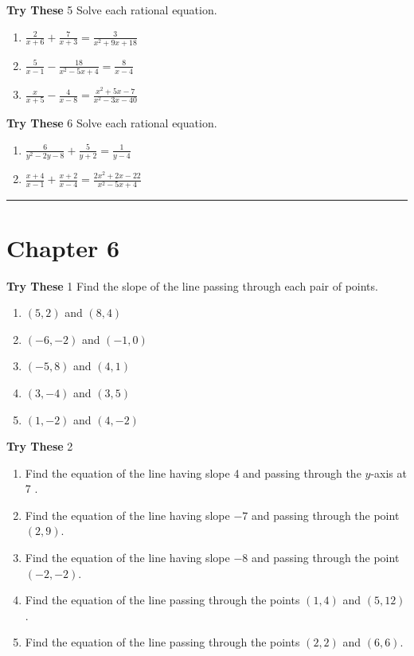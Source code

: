 \documentclass[a4paper]{JAC2003}
\begin{document}
\noindent\textcolor{red!75!black}{\textbf{Try These}} 5 Solve each rational equation.
\begin{enumerate}
\item $\frac{2}{x+6}+\frac{7}{x+3}=\frac{3}{x^{2}+9 x+18}$

\item $\frac{5}{x-1}-\frac{18}{x^{2}-5 x+4}=\frac{8}{x-4}$

\item $\frac{x}{x+5}-\frac{4}{x-8}=\frac{x^{2}+5 x-7}{x^{2}-3 x-40}$
\end{enumerate}

\noindent\textcolor{red!75!black}{\textbf{Try These}} 6 Solve each rational equation.
\begin{enumerate}
\item $\frac{6}{y^{2}-2 y-8}+\frac{5}{y+2}=\frac{1}{y-4}$

\item $\frac{x+4}{x-1}+\frac{x+2}{x-4}=\frac{2 x^{2}+2 x-22}{x^{2}-5 x+4}$
\end{enumerate}
\noindent\rule[0.5ex]{\linewidth}{1pt}

\section{Chapter 6}

\noindent\textcolor{red!75!black}{\textbf{Try These}} 1 Find the slope of the line passing through each pair of points.
\begin{enumerate}
\item $(5,2)$ and $(8,4)$

\item $(-6,-2)$ and $(-1,0)$

\item $(-5,8)$ and $(4,1)$

\item $(3,-4)$ and $(3,5)$

\item $(1,-2)$ and $(4,-2)$
\end{enumerate}

\noindent\textcolor{red!75!black}{\textbf{Try These}} 2
\begin{enumerate}
\item Find the equation of the line having slope 4 and passing through the $y$-axis at 7 .

\item Find the equation of the line having slope $-7$ and passing through the point $(2,9)$.

\item Find the equation of the line having slope $-8$ and passing through the point $(-2,-2)$.

\item Find the equation of the line passing through the points $(1,4)$ and $(5,12)$.

\item Find the equation of the line passing through the points $(2,2)$ and $(6,6)$.
    \end{enumerate}
\end{document}
